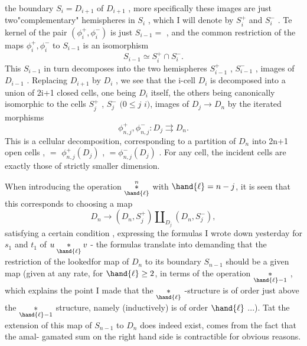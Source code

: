 
the boundary  $S_i = D_{i+1}$ of $D_{i+1}$ , more specifically these images are
just two"complementary" hemispheres in $S_i$ , which I will denote by
$S_i^+$ and $S_i^-$ . Te kernel of the pair $(\phi_i^+ , \phi_i^-)$ is just $S_{i-1} =$  ,
and the common restriction of the maps $\phi_i^+ , \phi_i^-$ to $S_{i-1}$ is an isomorphism
\[ S_{i-1} \simeq S_i^+ \cap S_i^- . \]
This $S_{i-1}$ in turn decomposes into the two hemispheres $S_{i-1}^+$ , $S_{i-1}^-$ ,
images of $D_{i-1}$ . Replacing $D_{i+1}$ by $D_i$ , we see that the i-cell $D_i$
is decomposed into a union of 2i+1 closed cells, one being $D_i$ itself,
the others being canonically isomorphic to the cells $S_j^+$ , $S_j^-$ $(0 \leq j$ \unsure{$\leq$|$<$} $i)$,
images of $D_j \longrightarrow D_n$ by the iterated morphisms
\[ \phi_{n,j}^+ , \phi_{n,j}^- : D_j \rightrightarrows D_n . \]
This is a cellular decomposition, corresponding to a partition of $D_n$
into 2n+1 open cells  ,  $=$  $\phi_{n,j}^+(D_j)$ ,  $= \phi_{n,j}^-(D_j)$ . For
any cell, the incident cells are exactly those of strictly smaller
dimension.

When introducing the operation $\overset{n}{\underset{\hand{\ell}}{*}}$ with $\hand{\ell} = n-j$, it is seen that
this corresponds to choosing a map
\[ D_n \longrightarrow (D_n , S_j^+) \amalg_{D_j} (D_n , S_j^-) , \]
satisfying a certain condition \unsure{$*$}, expressing the formulas I wrote down
yesterday for $s_1$ and $t_1$ of $u \underset{\hand{\ell}}{*} v$ - the  formulas translate
into demanding that the restriction of the looked\hand{-}for map of $D_n$ to its
boundary $S_{n-1}$ should be a given map (given at any rate, for $\hand{\ell} \geq 2$, in
terms of the operation $\underset{\hand{\ell}-1}{*}$ , which explains the point I
made that the $\underset{\hand{\ell}}{*}$ -structure is of order just above the $\underset{\hand{\ell}-1}{*}$ structure,
namely (inductively) is of order $\hand{\ell}$ ...). Tat the extension of this
map of $S_{n-1}$ to $D_n$ does indeed exist, comes from the fact that the amal-%
gamated sum on the right hand side is contractible for obvious reasons.

